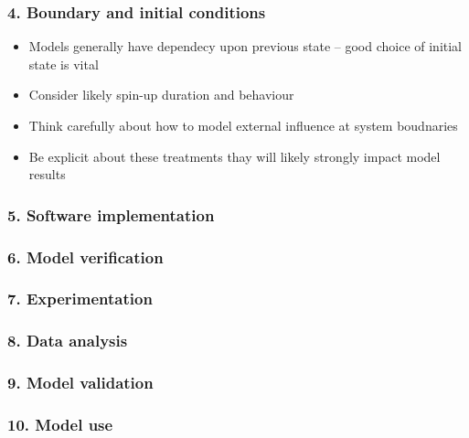 \subsubsection{4. Boundary and initial conditions}
\begin{itemize}
\item Models generally have dependecy upon previous state -- good choice of initial state is vital
\item Consider likely spin-up duration and behaviour
\item Think carefully about how to model external influence at system boudnaries
\item Be explicit about these treatments thay will likely strongly impact model 
results
\end{itemize}

\subsubsection{5. Software implementation}

\subsubsection{6. Model verification}

\subsubsection{7. Experimentation}

\subsubsection{8. Data analysis}

\subsubsection{9. Model validation}

\subsubsection{10. Model use}
